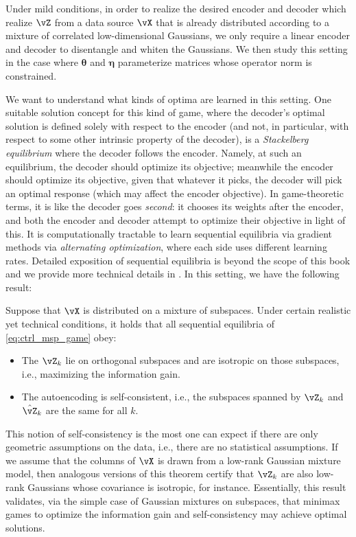 \documentclass[../../book-main.tex]{subfiles}
\begin{document}
Under mild conditions, in order to realize the desired encoder and decoder which realize \(\vZ\) from a data source \(\vX\) that is already distributed according to a mixture of correlated low-dimensional Gaussians, we only require a linear encoder and decoder to disentangle and whiten the Gaussians. We then study this setting in the case where \(\bm \theta\) and \(\bm \eta\) parameterize matrices whose operator norm is constrained. 

We want to understand what kinds of optima are learned in this setting. One suitable solution concept for this kind of game, where the decoder's optimal solution is defined solely with respect to the encoder (and not, in particular, with respect to some other intrinsic property of the decoder), is a \textit{Stackelberg equilibrium} where the decoder follows the encoder. %
Namely, at such an equilibrium, the decoder should optimize its objective; meanwhile the encoder should optimize its objective, given that whatever it picks, the decoder will pick an optimal response (which may affect the encoder objective). In game-theoretic terms, it is like the decoder goes \textit{second}: it chooses its weights after the encoder, and both the encoder and decoder attempt to optimize their objective in light of this. It is computationally tractable to learn sequential equilibria via gradient methods via \textit{alternating optimization}, where each side uses different learning rates. Detailed exposition of sequential equilibria is beyond the scope of this book and we provide more technical details in . In this setting, we have the following result:
\begin{theorem}\label{thm:ctrl_theory}
    Suppose that \(\vX\) is distributed on a mixture of subspaces. Under certain realistic yet technical conditions, it holds that all sequential equilibria of \eqref{eq:ctrl_msp_game} obey:
    \begin{itemize}
        \item The \(\vZ_{k}\) lie on orthogonal subspaces and are isotropic on those subspaces, i.e., maximizing the information gain.
        \item The autoencoding is self-consistent, i.e., the subspaces spanned by \(\vZ_{k}\) and \(\hat{\vZ}_{k}\) are the same for all \(k\).
    \end{itemize}
\end{theorem}
This notion of self-consistency is the most one can expect if there are only geometric assumptions on the data, i.e., there are no statistical assumptions. If we assume that the columns of \(\vX\) is drawn from a low-rank Gaussian mixture model, then analogous versions of this theorem certify that \(\vZ_{k}\) are also low-rank Gaussians whose covariance is isotropic, for instance. %
Essentially, this result validates, via the simple case of Gaussian mixtures on subspaces, that minimax games to optimize the information gain and self-consistency may achieve optimal solutions.
\end{document}
